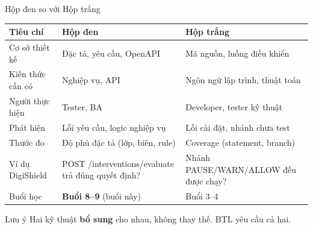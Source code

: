 \documentclass[aspectratio=169,12pt]{beamer}
\begin{document}
\begin{frame}[shrink=8]{Hộp đen so với Hộp trắng}
  \vspace{-0.2em}
  \begin{center}
  \scriptsize
  \renewcommand{\arraystretch}{0.9}
  \begin{tabular}{p{2.5cm}p{3.9cm}p{3.9cm}}
    \toprule
    \textbf{Tiêu chí} & \textbf{Hộp đen} & \textbf{Hộp trắng} \\
    \midrule
    Cơ sở thiết kế & Đặc tả, yêu cầu, OpenAPI & Mã nguồn, luồng điều khiển \\
    Kiến thức cần có & Nghiệp vụ, API & Ngôn ngữ lập trình, thuật toán \\
    Người thực hiện & Tester, BA & Developer, tester kỹ thuật \\
    Phát hiện & Lỗi yêu cầu, logic nghiệp vụ & Lỗi cài đặt, nhánh chưa test \\
    Thước đo & Độ phủ đặc tả (lớp, biên, rule) & Coverage (statement, branch) \\
    Ví dụ DigiShield & POST /interventions/evaluate trả đúng quyết định? & Nhánh PAUSE/WARN/ALLOW đều được chạy? \\
    Buổi học & \textbf{Buổi 8--9} (buổi này) & Buổi 3--4 \\
    \bottomrule
  \end{tabular}
  \renewcommand{\arraystretch}{1}
  \end{center}

  \vspace{0.05em}
  \begin{alertblock}{Lưu ý}
    Hai kỹ thuật \textbf{bổ sung} cho nhau, không thay thế. BTL yêu cầu cả hai.
  \end{alertblock}
\end{frame}
\end{document}
